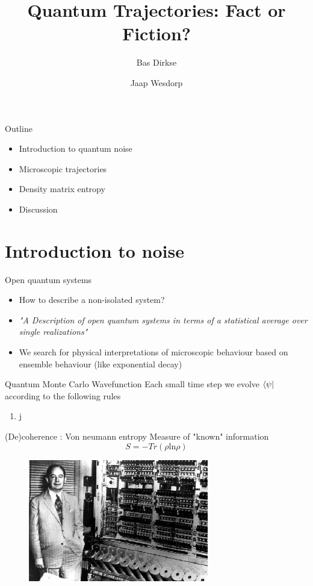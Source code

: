 \documentclass{beamer}
\title[]{Quantum Trajectories: Fact or Fiction?}
\institute[]{Delft University of Technology, The Netherlands}
\author{Bas Dirkse \and Jaap Wesdorp}
\begin{document}
{
\frame{\titlepage}
}

{

}

\begin{frame}{Outline}
\begin{itemize}
	\item Introduction to quantum noise
	\item Microscopic trajectories
	\item Density matrix entropy
	\item Discussion
\end{itemize}
\end{frame}

\section{Introduction to noise}
\begin{frame}{Open quantum systems}
	\begin{itemize}
		\item 	How to describe a non-isolated system?
		\item 	\emph{"A Description of open quantum systems in terms of a statistical average over single realizations"}
		\item We search for physical interpretations of microscopic behaviour based on ensemble behaviour (like exponential decay)
	\end{itemize}

\end{frame}

\begin{frame}{Quantum Monte Carlo Wavefunction}
		Each small time step we evolve $\bra{\psi}$ according to the following rules
		\begin{enumerate}
			\item j
		\end{enumerate}
\end{frame}

\begin{frame}{(De)coherence : Von neumann entropy}
	Measure of "known" information
	\begin{equation}
	S = -Tr(\rho \text{ln}\rho)
	\end{equation}
	\begin{figure}
		\centering
		\includegraphics[width=0.7\textwidth]{figs/von_neumann_5.jpeg}
	\end{figure}
\end{frame}
\end{document}
